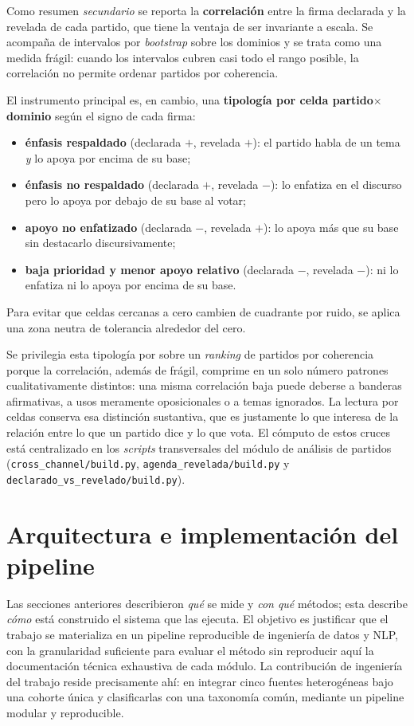 Como resumen \emph{secundario} se reporta la \textbf{correlación} entre la firma
declarada y la revelada de cada partido, que tiene la ventaja de ser invariante a
escala. Se acompaña de intervalos por \emph{bootstrap} sobre los dominios y se
trata como una medida frágil: cuando los intervalos cubren casi todo el rango
posible, la correlación no permite ordenar partidos por coherencia.

El instrumento principal es, en cambio, una \textbf{tipología por celda
partido$\times$dominio} según el signo de cada firma:
\begin{itemize}
  \item \textbf{énfasis respaldado} (declarada $+$, revelada $+$): el partido
        habla de un tema \emph{y} lo apoya por encima de su base;
  \item \textbf{énfasis no respaldado} (declarada $+$, revelada $-$): lo enfatiza
        en el discurso pero lo apoya por debajo de su base al votar;
  \item \textbf{apoyo no enfatizado} (declarada $-$, revelada $+$): lo apoya más
        que su base sin destacarlo discursivamente;
  \item \textbf{baja prioridad y menor apoyo relativo} (declarada $-$,
        revelada $-$): ni lo enfatiza ni lo apoya por encima de su base.
\end{itemize}
Para evitar que celdas cercanas a cero cambien de cuadrante por ruido, se aplica
una zona neutra de tolerancia alrededor del cero.

Se privilegia esta tipología por sobre un \emph{ranking} de partidos por
coherencia porque la correlación, además de frágil, comprime en un solo número
patrones cualitativamente distintos: una misma correlación baja puede deberse a
banderas afirmativas, a usos meramente oposicionales o a temas ignorados. La
lectura por celdas conserva esa distinción sustantiva, que es justamente lo que
interesa de la relación entre lo que un partido dice y lo que vota. El cómputo de
estos cruces está centralizado en los \emph{scripts} transversales del módulo de
análisis de partidos (\texttt{cross\_channel/build.py},
\texttt{agenda\_revelada/build.py} y \texttt{declarado\_vs\_revelado/build.py}).

\section{Arquitectura e implementación del pipeline}
\label{sec:arquitectura}

Las secciones anteriores describieron \emph{qué} se mide y \emph{con qué}
métodos; esta describe \emph{cómo} está construido el sistema que las ejecuta.
El objetivo es justificar que el trabajo se materializa en un pipeline
reproducible de ingeniería de datos y NLP, con la granularidad suficiente para
evaluar el método sin reproducir aquí la documentación técnica exhaustiva de cada
módulo. La contribución de ingeniería del trabajo reside precisamente ahí: en
integrar cinco fuentes heterogéneas bajo una cohorte única y clasificarlas con
una taxonomía común, mediante un pipeline modular y reproducible.

